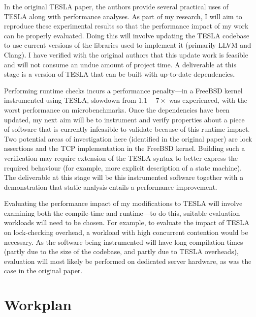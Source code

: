 \documentclass[11pt]{article}
\begin{document}
In the original TESLA paper, the authors provide several practical uses of TESLA along
with performance analyses. As part of my research, I will aim to reproduce these
experimental results so that the performance impact of my work can be properly evaluated.
Doing this will involve updating the TESLA codebase to use current versions of the
libraries used to implement it (primarily LLVM and Clang). I have verified with the
original authors that this update work is feasible and will not consume an undue amount of
project time. A deliverable at this stage is a version of TESLA that can be built with
up-to-date dependencies.

Performing runtime checks incurs a performance penalty---in a FreeBSD kernel instrumented
using TESLA, slowdown from $1.1-7\times$ was experienced, with the worst performance on
microbenchmarks. Once the dependencies have been updated, my next aim will be to
instrument and verify properties about a piece of software that is currently infeasible to
validate because of this runtime impact. Two potential areas of investigation here
(identified in the original paper) are lock assertions and the TCP implementation in the
FreeBSD kernel. Building such a verification may require extension of the TESLA syntax to
better express the required behaviour (for example, more explicit description of a state
machine). The deliverable at this stage will be this instrumented software together with a
demonstration that static analysis entails a performance improvement.

Evaluating the performance impact of my modifications to TESLA will involve examining both
the compile-time and runtime---to do this, suitable evaluation workloads will need to be
chosen. For example, to evaluate the impact of TESLA on lock-checking overhead, a workload
with high concurrent contention would be necessary. As the software being instrumented
will have long compilation times (partly due to the size of the codebase, and partly due
to TESLA overheads), evaluation will most likely be performed on dedicated server
hardware, as was the case in the original paper.

\section{Workplan}
\end{document}
